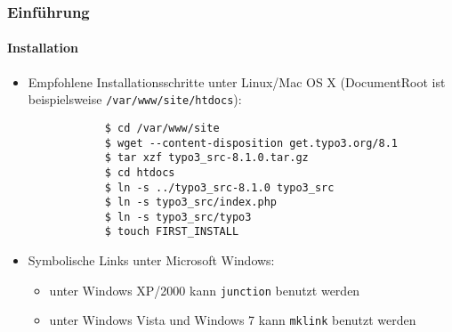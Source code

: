 \begin{frame}[fragile]
	\frametitle{Einführung}
	\framesubtitle{Installation}

	\begin{itemize}
		\item Empfohlene Installationsschritte unter Linux/Mac OS X\newline
			(DocumentRoot ist beispielsweise \texttt{/var/www/site/htdocs}):
		\begin{lstlisting}
			$ cd /var/www/site
			$ wget --content-disposition get.typo3.org/8.1
			$ tar xzf typo3_src-8.1.0.tar.gz
			$ cd htdocs
			$ ln -s ../typo3_src-8.1.0 typo3_src
			$ ln -s typo3_src/index.php
			$ ln -s typo3_src/typo3
			$ touch FIRST_INSTALL
		\end{lstlisting}

		\item Symbolische Links unter Microsoft Windows:

			\begin{itemize}
				\item unter Windows XP/2000 kann \texttt{junction} benutzt werden
				\item unter Windows Vista und Windows 7 kann \texttt{mklink} benutzt werden
			\end{itemize}

	\end{itemize}
\end{frame}

